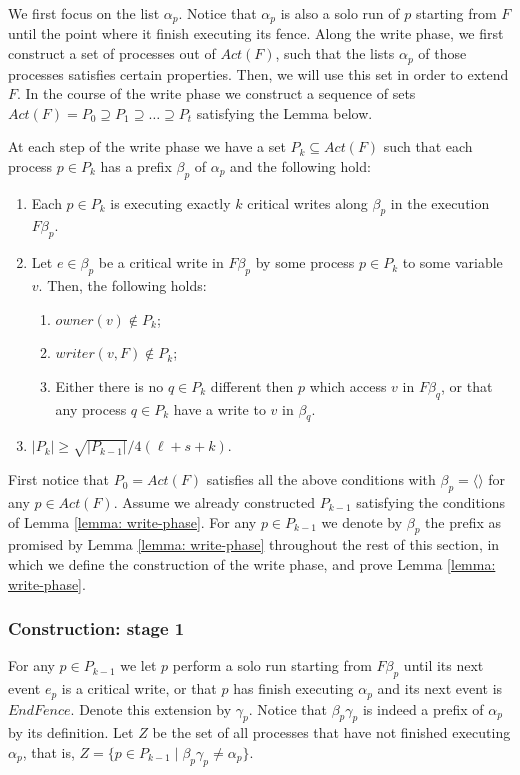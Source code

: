 We first focus on the list $\alpha_p$. Notice that $\alpha_p$ is also a solo run of $p$ starting from $F$ until the point where it finish executing its fence. Along the write phase, we first construct a set of processes out of $Act(F)$, such that the lists $\alpha_p$ of those processes satisfies certain properties. Then, we will use this set in order to extend $F$.
In the course of the write phase we construct a sequence of sets $Act(F) = P_0 \supseteq P_1 \supseteq \ldots \supseteq P_t$ satisfying the Lemma below.

\begin{lemma} \label{lemma: write-phase}
	At each step of the write phase we have a set $P_k \subseteq Act(F)$ such that each process $p \in P_k$ has a prefix $\beta_p$ of $\alpha_p$ and the following hold:
	\begin{enumerate}[(1)]
		\item Each $p \in P_k$ is executing exactly $k$ critical writes along $\beta_p$ in the execution $F \beta_p$.
		\item Let $e \in \beta_p$ be a critical write in $F \beta_p$ by some process $p \in P_k$ to some variable $v$. Then, the following holds:
		\begin{enumerate}
			\item $owner(v) \notin P_k$;
			\item $writer(v,F) \notin P_k$;
			\item Either there is no $q \in P_k$ different then $p$ which access $v$ in $F \beta_q$, or that any process $q \in P_k$ have a write to $v$ in $\beta_q$.
		\end{enumerate}
		\item $|P_k| \geq \sqrt{|P_{k-1}|}/4(\ell+s+k)$.
	\end{enumerate}
\end{lemma}

First notice that $P_0=Act(F)$ satisfies all the above conditions with $\beta_p=\langle \rangle$ for any $p \in Act(F)$. Assume we already constructed $P_{k-1}$ satisfying the conditions of Lemma \ref{lemma: write-phase}. For any $p \in P_{k-1}$ we denote by $\beta_p$ the prefix as promised by Lemma \ref{lemma: write-phase} throughout the rest of this section, in which we define the construction of the write phase, and prove Lemma \ref{lemma: write-phase}.

\subsubsection{Construction: stage 1}
For any $p \in P_{k-1}$ we let $p$ perform a solo run starting from $F \beta_p$ until its next event $e_p$ is a critical write, or that $p$ has finish executing $\alpha_p$ and its next event is $EndFence$. Denote this extension by $\gamma_p$. Notice that $\beta_p \gamma_p$ is indeed a prefix of $\alpha_p$ by its definition.
Let $Z$ be the set of all processes that have not finished executing $\alpha_p$, that is, $Z = \{p \in P_{k-1} \mid \beta_p \gamma_p \neq \alpha_p\}$.

